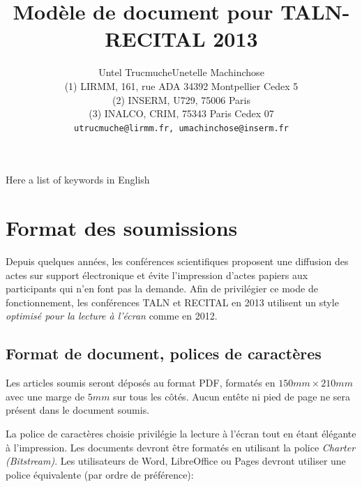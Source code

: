 \documentclass[10pt,a4paper,twoside]{article}
\title{Modèle de document pour TALN-RECITAL 2013}
\author{Untel Trucmuche\up{1, 2}\quad Unetelle Machinchose\up{1, 3}\\
{\small  (1) LIRMM, 161, rue ADA  34392 Montpellier Cedex 5\\ 
  (2) INSERM, U729, 75006 Paris \\ 
  (3) INALCO, CRIM, 75343 Paris Cedex 07 \\ 
  \texttt{utrucmuche@lirmm.fr, umachinchose@inserm.fr} \\ 
}}
\begin{document}
\maketitle



{Here a list of keywords in English}


\section{Format des soumissions}

Depuis quelques années, les conférences scientifiques proposent une diffusion des actes sur support électronique et évite l'impression d'actes papiers aux participants qui n'en font pas la demande. Afin de privilégier ce mode de fonctionnement, les conférences TALN et RECITAL en 2013 utilisent un style \emph{optimisé pour la lecture à l'écran} comme en 2012.

\subsection{Format de document, polices de caractères}

Les articles soumis seront déposés au format PDF, formatés en $150mm \times 210mm$ avec une marge de $5mm$ sur tous les côtés. Aucun entête ni pied de page ne sera présent dans le document soumis.

La police de caractères choisie privilégie la lecture à l'écran tout en étant élégante à l'impression. Les documents devront être formatés en utilisant la police \emph{Charter (Bitstream)}. Les utilisateurs de Word, LibreOffice ou Pages devront utiliser une police équivalente (par ordre de préférence):
\end{document}
